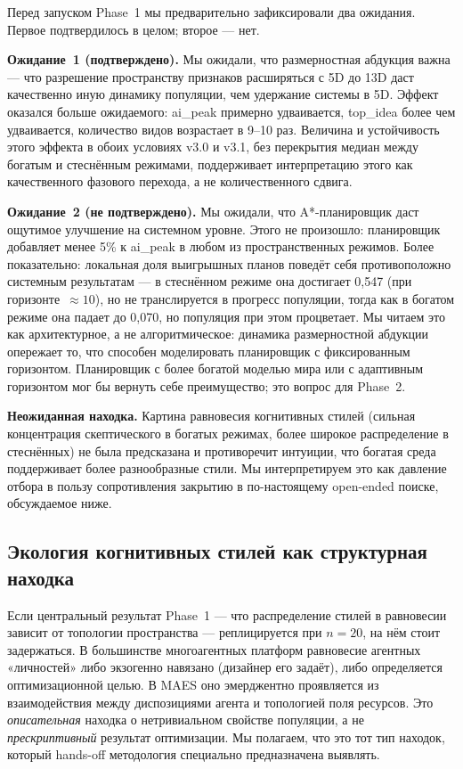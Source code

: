 \documentclass[11pt,a4paper]{article}
\begin{document}
Перед запуском Phase~1 мы предварительно зафиксировали два ожидания.
Первое подтвердилось в целом; второе --- нет.

\textbf{Ожидание~1 (подтверждено).} Мы ожидали, что размерностная
абдукция важна --- что разрешение пространству признаков расширяться
с 5D до 13D даст качественно иную динамику популяции, чем удержание
системы в 5D. Эффект оказался больше ожидаемого: ai\_peak примерно
удваивается, top\_idea более чем удваивается, количество видов
возрастает в 9--10 раз. Величина и устойчивость этого эффекта в обоих
условиях v3.0 и v3.1, без перекрытия медиан между богатым и стеснённым
режимами, поддерживает интерпретацию этого как качественного фазового
перехода, а не количественного сдвига.

\textbf{Ожидание~2 (не подтверждено).} Мы ожидали, что A*-планировщик
даст ощутимое улучшение на системном уровне. Этого не произошло:
планировщик добавляет менее 5\% к ai\_peak в любом из пространственных
режимов. Более показательно: локальная доля выигрышных планов
поведёт себя противоположно системным результатам --- в стеснённом
режиме она достигает 0{,}547 (при горизонте~$\approx 10$), но не
транслируется в прогресс популяции, тогда как в богатом режиме она
падает до 0{,}070, но популяция при этом процветает. Мы читаем это
как архитектурное, а не алгоритмическое: динамика размерностной
абдукции опережает то, что способен моделировать планировщик с
фиксированным горизонтом. Планировщик с более богатой моделью мира
или с адаптивным горизонтом мог бы вернуть себе преимущество; это
вопрос для Phase~2.

\textbf{Неожиданная находка.} Картина равновесия когнитивных стилей
(сильная концентрация скептического в богатых режимах, более широкое
распределение в стеснённых) не была предсказана и противоречит
интуиции, что богатая среда поддерживает более разнообразные стили.
Мы интерпретируем это как давление отбора в пользу сопротивления
закрытию в по-настоящему open-ended поиске, обсуждаемое ниже.

\subsection{Экология когнитивных стилей как структурная находка}

Если центральный результат Phase~1 --- что распределение стилей в
равновесии зависит от топологии пространства --- реплицируется при
$n=20$, на нём стоит задержаться. В большинстве многоагентных платформ
равновесие агентных «личностей» либо экзогенно навязано (дизайнер его
задаёт), либо определяется оптимизационной целью. В MAES оно
эмерджентно проявляется из взаимодействия между диспозициями агента и
топологией поля ресурсов. Это \emph{описательная} находка о нетривиальном
свойстве популяции, а не \emph{прескриптивный} результат оптимизации. Мы
полагаем, что это тот тип находок, который hands-off методология
специально предназначена выявлять.
\end{document}
